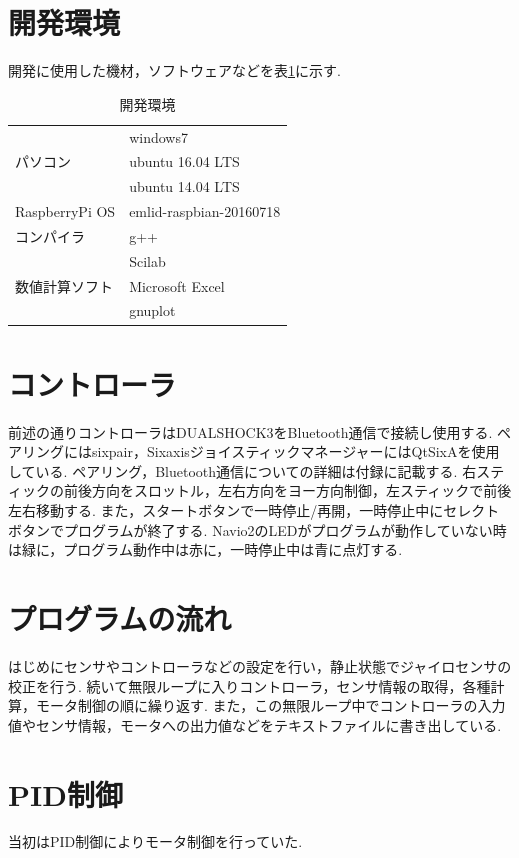\documentclass[12pt,oneside]{sotsuken_paper}
\begin{document}
\section{開発環境}
開発に使用した機材，ソフトウェアなどを表\ref{table:dev}に示す.

\begin{table}[htbp]
	\begin{center}
		\caption{開発環境}
		\begin{tabular}{|l|l|} \hline
			 & windows7 \\
			パソコン & ubuntu 16.04 LTS \\
			 & ubuntu 14.04 LTS \\ \hline
			RaspberryPi OS & emlid-raspbian-20160718 \\ \hline
			コンパイラ & g++ \\ \hline
			 & Scilab \\
			数値計算ソフト & Microsoft Excel \\
			 & gnuplot \\ \hline
		\end{tabular}
		\label{table:dev}
	\end{center}
\end{table}

\section{コントローラ}
前述の通りコントローラはDUALSHOCK3をBluetooth通信で接続し使用する.
ペアリングにはsixpair，SixaxisジョイスティックマネージャーにはQtSixAを使用している.
ペアリング，Bluetooth通信についての詳細は付録に記載する.
右スティックの前後方向をスロットル，左右方向をヨー方向制御，左スティックで前後左右移動する.
また，スタートボタンで一時停止/再開，一時停止中にセレクトボタンでプログラムが終了する.
Navio2のLEDがプログラムが動作していない時は緑に，プログラム動作中は赤に，一時停止中は青に点灯する.

\section{プログラムの流れ}
はじめにセンサやコントローラなどの設定を行い，静止状態でジャイロセンサの校正を行う.
続いて無限ループに入りコントローラ，センサ情報の取得，各種計算，モータ制御の順に繰り返す.
また，この無限ループ中でコントローラの入力値やセンサ情報，モータへの出力値などをテキストファイルに書き出している.

\section{PID制御}
当初はPID制御によりモータ制御を行っていた.
\end{document}
